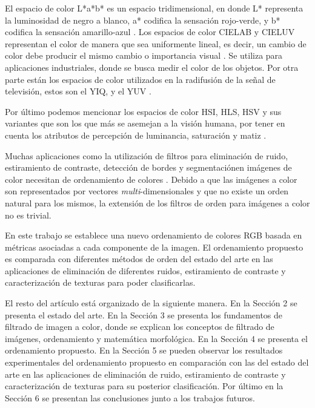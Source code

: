 El espacio de color L*a*b* es un espacio tridimensional, en donde L* representa la luminosidad de negro a blanco, a* codifica la sensaci\'on rojo-verde, y b* codifica la sensaci\'on amarillo-azul \cite{leon2006color}. 
Los espacios de color CIELAB y CIELUV representan el color de manera que sea uniformente lineal, es decir, un cambio de color debe producir el mismo cambio o importancia visual \cite{mahy1994evaluation}. Se utiliza para aplicaciones industriales, donde se busca medir el color de los objetos.  Por otra parte est\'an los espacios de color utilizados en la radifusi\'on de la se\~nal de televisi\'on, estos son el YIQ, y el YUV \cite{munson1995color}.

Por \'ultimo podemos mencionar los espacios de color HSI, HLS, HSV y sus variantes que son los que m\'as se asemejan a la visi\'on humana, por tener en cuenta los atributos de percepci\'on de luminancia, saturaci\'on y matiz \cite{zamora2001comparative}.

Muchas aplicaciones como la utilización de filtros para eliminaci\'on de ruido, estiramiento de contraste, detecci\'on de bordes y segmentaci\'onen imágenes de color necesitan de ordenamiento de colores  \cite{ortiz2002procesamiento}.  Debido a que las im\'agenes a color son representados por vectores \textit{multi}-dimensionales y que no existe un orden natural para los mismos, la extensi\'on de los filtros de orden para im\'agenes a color no es trivial. 


En este trabajo se establece una nuevo ordenamiento de colores RGB basada en m\'etricas asociadas a cada  componente de la imagen.  El ordenamiento propuesto es comparada con diferentes m\'etodos de orden del estado del arte en las aplicaciones de eliminaci\'on de diferentes ruidos, estiramiento de contraste y caracterización de texturas para poder clasificarlas. 

El resto del art\'iculo est\'a organizado de la siguiente manera. En la Secci\'on 2 se presenta el estado del arte. En la Secci\'on 3 se presenta los fundamentos de filtrado de imagen a color, donde se explican	los conceptos de filtrado de im\'agenes, ordenamiento y matem\'atica morfol\'ogica. En la Secci\'on 4 se presenta el  ordenamiento propuesto. En la Secci\'on 5 se pueden observar los resultados experimentales del ordenamiento propuesto en comparaci\'on con las del estado del arte en las aplicaciones de  eliminaci\'on de ruido, estiramiento de contraste y caracterización de texturas para su posterior clasificaci\'on. Por \'ultimo en la Secci\'on 6 se presentan las conclusiones junto a los trabajos futuros.

